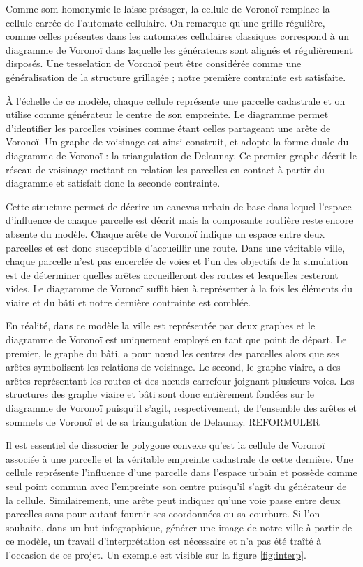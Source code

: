 \documentclass[12pt]{article}
\begin{document}
Comme som homonymie le laisse présager, la cellule de Voronoï remplace
la cellule carrée de l'automate cellulaire. On remarque qu'une grille
régulière, comme celles présentes dans les automates cellulaires
classiques correspond à un diagramme de Voronoï dans laquelle les
générateurs sont alignés et régulièrement disposés. Une tesselation de
Voronoï peut être considérée comme une généralisation de la structure
grillagée ; notre première contrainte est satisfaite.

À l'échelle de ce modèle, chaque cellule représente une parcelle
cadastrale et on utilise comme générateur le centre de son
empreinte. Le diagramme permet d'identifier les parcelles voisines
comme étant celles partageant une arête de Voronoï. Un graphe de
voisinage est ainsi construit, et adopte la forme duale du diagramme
de Voronoï : la triangulation de Delaunay. Ce premier graphe décrit le
réseau de voisinage mettant en relation les parcelles en contact à
partir du diagramme et satisfait donc la seconde contrainte.

Cette structure permet de décrire un canevas urbain de base dans
lequel l'espace d'influence de chaque parcelle est décrit mais la
composante routière reste encore absente du modèle. Chaque arête de
Voronoï indique un espace entre deux parcelles et est donc susceptible
d'accueillir une route. Dans une véritable ville, chaque parcelle
n'est pas encerclée de voies et l'un des objectifs de la simulation
est de déterminer quelles arêtes accueilleront des routes et
lesquelles resteront vides. Le diagramme de Voronoï suffit bien à
représenter à la fois les éléments du viaire et du bâti et notre
dernière contrainte est comblée.

En réalité, dans ce modèle la ville est représentée par deux graphes
et le diagramme de Voronoï est uniquement employé en tant que point de
départ. Le premier, le graphe du bâti, a pour n\oe ud les centres des
parcelles alors que ses arêtes symbolisent les relations de
voisinage. Le second, le graphe viaire, a des arêtes représentant les
routes et des n\oe uds carrefour joignant plusieurs voies. Les
structures des graphe viaire et bâti sont donc entièrement fondées sur
le diagramme de Voronoï puisqu'il s'agit, respectivement, de
l'ensemble des arêtes et sommets de Voronoï et de sa triangulation de
Delaunay. REFORMULER

Il est essentiel de dissocier le polygone convexe qu'est la cellule de
Voronoï associée à une parcelle et la véritable empreinte cadastrale
de cette dernière. Une cellule représente l'influence d'une parcelle
dans l'espace urbain et possède comme seul point commun avec
l'empreinte son centre puisqu'il s'agit du générateur de la
cellule. Similairement, une arête peut indiquer qu'une voie passe
entre deux parcelles sans pour autant fournir ses coordonnées ou sa
courbure. Si l'on souhaite, dans un but infographique, générer une
image de notre ville à partir de ce modèle, un travail
d'interprétation est nécessaire et n'a pas été traîté à l'occasion de
ce projet. Un exemple est visible sur la figure \ref{fig:interp}.
\end{document}
